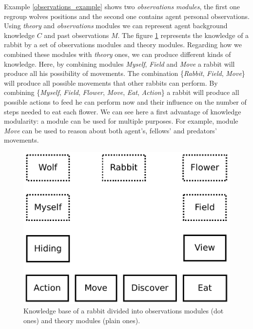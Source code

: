 \documentclass{aamas2012}
\begin{document}
	Example \ref{observations_example} shows two \emph{observations modules}, 
	the first one regroup wolves positions and the second one contains agent personal observations.
	Using \emph{theory} and \emph{observations} modules we can represent agent background knowledge $C$ and past observations $M$.
	The figure \ref{module_combination} represents the knowledge of a rabbit by a set of observations modules and theory modules.
	Regarding how we combined these modules with \emph{theory} ones, we can produce different kinds of knowledge.
	Here, by combining modules \emph{Myself}, \emph{Field} and \emph{Move} a rabbit will produce all his possibility of movements.
	The combination \{\emph{Rabbit}, \emph{Field}, \emph{Move}\} will produce all possible movements that other rabbits can perform. 
	By combining \{\emph{Myself}, \emph{Field}, \emph{Flower}, \emph{Move}, \emph{Eat}, \emph{Action}\} 
	a rabbit will produce all possible actions to feed he can perform now and their influence on the number of steps needed to eat each flower.
	We can see here a first advantage of knowledge modularity: a module can be used for multiple purposes. 
	For example, module \emph{Move} can be used to reason about both agent's, fellows' and predators' movements.

	\begin{figure}
		\centering
		\includegraphics[keepaspectratio=true, scale=0.4]{module_combination.pdf}
		\caption
		{
			\label{module_combination}
			Knowledge base of a rabbit divided into observations modules (dot ones) and theory modules (plain ones).
		}
	\end{figure}
\end{document}
